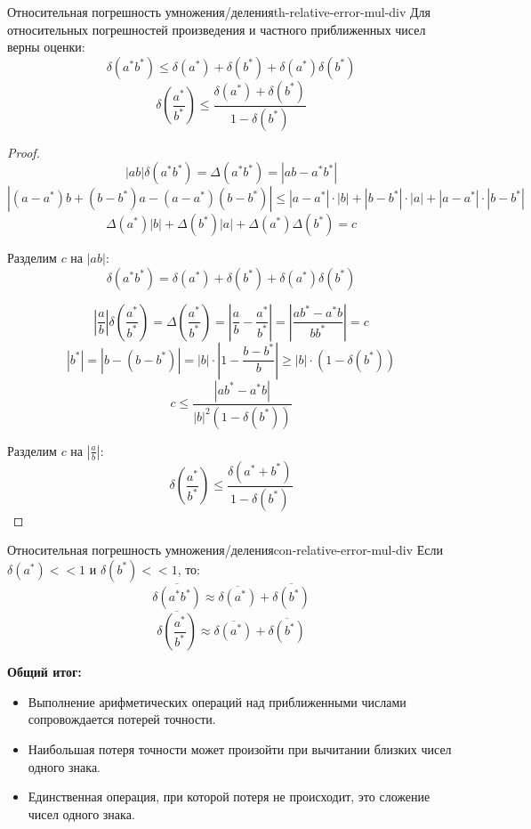 \documentclass[14pt]{extarticle}
\begin{document}
        \begin{theorem}{Относительная погрешность умножения/деления}{th-relative-error-mul-div}
            Для относительных погрешностей произведения и частного приближенных чисел верны оценки:
            $$\delta(a^{*}b^{*}) \leq \delta(a^{*}) + \delta(b^{*}) + \delta(a^{*})\delta(b^{*})$$
            $$\delta(\frac{a^{*}}{b^{*}}) \leq \frac{\delta(a^{*}) + \delta(b^{*})}{1 - \delta(b^{*})}$$

            \begin{proof}
                $$|ab|\delta(a^{*}b^{*}) = \Delta(a^{*}b^{*}) = |ab - a^{*}b^{*}| $$ 
                $$|(a - a^{*})b + (b - b^{*})a - (a - a^{*})(b - b^{*})| \leq |a - a^{*}| \cdot |b| + |b - b^{*}| \cdot |a| + |a - a^{*}| \cdot |b - b^{*}| $$ 
                $$\Delta(a^{*})|b| + \Delta(b^{*})|a| + \Delta(a^{*})\Delta(b^{*}) = c$$

                Разделим $c$ на $|ab|$:
                $$\delta(a^{*}b^{*}) = \delta(a^{*}) + \delta(b^{*}) + \delta(a^{*})\delta(b^{*})$$
            
                \vspace{\baselineskip}

                $$|\frac{a}{b}|\delta(\frac{a^{*}}{b^{*}}) = \Delta(\frac{a^{*}}{b^{*}}) = |\frac{a}{b} - \frac{a^{*}}{b^{*}}| = |\frac{ab^{*} - a^{*}b}{bb^{*}}| = c$$
                $$|b^{*}| = |b - (b - b^{*})| = |b| \cdot |1 - \frac{b - b^{*}}{b}| \geq |b| \cdot (1 - \delta(b^{*}))$$
                $$c \leq \frac{|ab^{*} - a^{*}b|}{|b|^{2}(1 - \delta(b^{*}))}$$

                Разделим $c$ на $|\frac{a}{b}|$:
                $$\delta(\frac{a^{*}}{b^{*}}) \leq \frac{\delta(a^{*} + b^{*})}{1 - \delta(b^{*})}$$
            \end{proof}
        \end{theorem}

        \begin{consequence}{Относительная погрешность умножения/деления}{con-relative-error-mul-div}
            Если $\delta(a^{*}) << 1$ и $\delta(b^{*}) << 1$, то:
            $$\overline{\delta(a^{*}b^{*})} \approx \overline{\delta(a^{*})} + \overline{\delta(b^{*})}$$
            $$\overline{\delta(\frac{a^{*}}{b^{*}})} \approx \overline{\delta(a^{*})} + \overline{\delta(b^{*})}$$
        \end{consequence}

        \textbf{Общий итог:}
        \begin{itemize}
            \item Выполнение арифметических операций над приближенными числами сопровождается потерей точности.
            \item Наибольшая потеря точности может произойти при вычитании близких чисел одного знака.
            \item Единственная операция, при которой потеря не происходит, это сложение чисел одного знака.
        \end{itemize}
\end{document}
